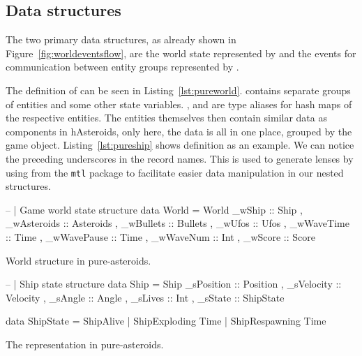 \documentclass[
  digital, %
  color,   %
  table,   %
  oneside, %
  lof,     %
  lot,     %
]{fithesis3}
\newcommand{\packagename}{\texttt}
\begin{document}
\subsection{Data structures}

The two primary data structures, as already shown in Figure~\ref{fig:worldeventsflow},
are the world state represented by  and the events for communication
between entity groups represented by .

The definition of  can be seen in Listing~\ref{lst:pureworld}.
 contains separate groups of entities and some other state variables.
,  and  are type
aliases for hash maps of the respective entities.
The entities themselves then contain similar data as components in hAsteroids,
only here, the data is all in one place, grouped by the game object.
Listing~\ref{lst:pureship} shows  definition as an example.
We can notice the preceding underscores in the record names. This is used
to generate lenses by using  from the \packagename{mtl} package
to facilitate easier data manipulation in our nested structures.

\begin{listing}[H]
\begin{haskell}
-- | Game world state structure 
data World =
    World
    { _wShip      :: Ship 
    , _wAsteroids :: Asteroids
    , _wBullets   :: Bullets
    , _wUfos      :: Ufos
    , _wWaveTime  :: Time
    , _wWavePause :: Time
    , _wWaveNum   :: Int
    , _wScore     :: Score
    }
\end{haskell}
\caption{World structure in pure-asteroids.}
\label{lst:pureworld}
\end{listing}

\begin{listing}[H]
\begin{haskell}
-- | Ship state structure
data Ship =
    Ship 
    { _sPosition :: Position
    , _sVelocity :: Velocity
    , _sAngle    :: Angle
    , _sLives    :: Int
    , _sState    :: ShipState
    }

data ShipState
    = ShipAlive
    | ShipExploding Time
    | ShipRespawning Time
\end{haskell}
\caption{The  representation in pure-asteroids.}
\label{lst:pureship}
\end{listing}
\pagebreak
\end{document}
